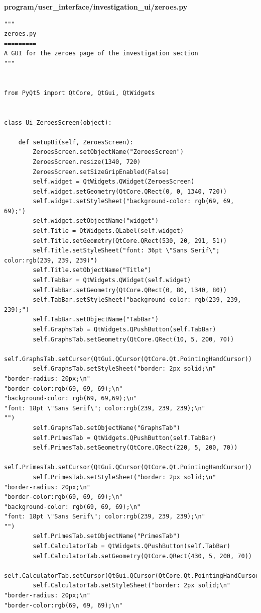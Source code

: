 \documentclass{article}
\begin{document}
\textbf{program/user\_interface/investigation\_ui/zeroes.py}

\begin{lstlisting}
"""
zeroes.py
=========
A GUI for the zeroes page of the investigation section
"""


from PyQt5 import QtCore, QtGui, QtWidgets


class Ui_ZeroesScreen(object):

    def setupUi(self, ZeroesScreen):
        ZeroesScreen.setObjectName("ZeroesScreen")
        ZeroesScreen.resize(1340, 720)
        ZeroesScreen.setSizeGripEnabled(False)
        self.widget = QtWidgets.QWidget(ZeroesScreen)
        self.widget.setGeometry(QtCore.QRect(0, 0, 1340, 720))
        self.widget.setStyleSheet("background-color: rgb(69, 69, 69);")
        self.widget.setObjectName("widget")
        self.Title = QtWidgets.QLabel(self.widget)
        self.Title.setGeometry(QtCore.QRect(530, 20, 291, 51))
        self.Title.setStyleSheet("font: 36pt \"Sans Serif\"; color:rgb(239, 239, 239)")
        self.Title.setObjectName("Title")
        self.TabBar = QtWidgets.QWidget(self.widget)
        self.TabBar.setGeometry(QtCore.QRect(0, 80, 1340, 80))
        self.TabBar.setStyleSheet("background-color: rgb(239, 239, 239);")
        self.TabBar.setObjectName("TabBar")
        self.GraphsTab = QtWidgets.QPushButton(self.TabBar)
        self.GraphsTab.setGeometry(QtCore.QRect(10, 5, 200, 70))
        self.GraphsTab.setCursor(QtGui.QCursor(QtCore.Qt.PointingHandCursor))
        self.GraphsTab.setStyleSheet("border: 2px solid;\n"
"border-radius: 20px;\n"
"border-color:rgb(69, 69, 69);\n"
"background-color: rgb(69, 69,69);\n"
"font: 18pt \"Sans Serif\"; color:rgb(239, 239, 239);\n"
"")
        self.GraphsTab.setObjectName("GraphsTab")
        self.PrimesTab = QtWidgets.QPushButton(self.TabBar)
        self.PrimesTab.setGeometry(QtCore.QRect(220, 5, 200, 70))
        self.PrimesTab.setCursor(QtGui.QCursor(QtCore.Qt.PointingHandCursor))
        self.PrimesTab.setStyleSheet("border: 2px solid;\n"
"border-radius: 20px;\n"
"border-color:rgb(69, 69, 69);\n"
"background-color: rgb(69, 69, 69);\n"
"font: 18pt \"Sans Serif\"; color:rgb(239, 239, 239);\n"
"")
        self.PrimesTab.setObjectName("PrimesTab")
        self.CalculatorTab = QtWidgets.QPushButton(self.TabBar)
        self.CalculatorTab.setGeometry(QtCore.QRect(430, 5, 200, 70))
        self.CalculatorTab.setCursor(QtGui.QCursor(QtCore.Qt.PointingHandCursor))
        self.CalculatorTab.setStyleSheet("border: 2px solid;\n"
"border-radius: 20px;\n"
"border-color:rgb(69, 69, 69);\n"

\end{lstlisting}
\end{document}

